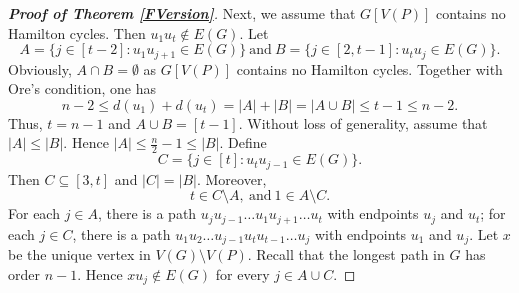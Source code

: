 \documentclass[11pt, a4paper]{article}
\theoremstyle{definition}
\newcommand{\<}{\subseteq}
\begin{document}
\begin{proof}[\bf Proof of Theorem \ref{FVersion}]
Next, we assume that $G[V(P)]$ contains no Hamilton cycles. Then $u_1u_t\notin E(G)$. %
Let
$$
A=\{j\in [t-2]:u_1u_{j+1}\in E(G)\}\ \text{and}\ B=\{j\in [2,t-1]:u_tu_{j}\in E(G)\}.
$$
Obviously, $A\cap B=\emptyset$ as $G[V(P)]$ contains no  Hamilton cycles. 
Together with Ore's condition, one has
$$
n-2\leq d(u_1)+d(u_t)=|A|+|B|=|A\cup B|\leq t-1\leq n-2.
$$
Thus, $t=n-1$ and $A\cup B=[t-1]$.  Without loss of generality, assume that $|A|\leq |B|$. Hence  $|A|\leq \frac{n}{2}-1\leq |B|.$ 
Define 
$$
C=\{j\in [t]:u_tu_{j-1}\in E(G)\}.
$$
Then $C\subseteq [3,t]$ and $|C|=|B|$. Moreover,
$$
t\in C\setminus A,\ \text{and}\ 1\in A\setminus C.
$$
For each $j\in A$, there is a path $u_ju_{j-1}\ldots u_1u_{j+1}\ldots u_t$ with endpoints $u_j$ and $u_t$; for each $j\in C$, there is a path $u_1u_2\ldots u_{j-1}u_{t}u_{t-1}\ldots u_{j}$ with endpoints $u_1$ and $u_j$. Let $x$ be the unique vertex in $V(G)\setminus V(P)$. Recall that the longest path in $G$ has order $n-1$. Hence $xu_j\notin E(G)$ for every $j\in A\cup C$. %

\end{proof}
\end{document}
